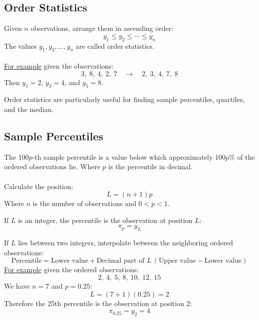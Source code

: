 ﻿\documentclass[12pt]{article}
\begin{document}
\subsection*{Order Statistics}
Given \(n\) observations, arrange them in ascending order:
\[
\boxed{y_1\leq y_2\leq\cdots\leq y_n}
\]
The values \(y_1,y_2,\ldots,y_n\) are called order statistics.\\\\
\underline{For example} given the observations:
\[
3,\ 8,\ 4,\ 2,\ 7\quad\longrightarrow\quad 2,\ 3,\ 4,\ 7,\ 8
\]
Then \(y_1=2\), \(y_3=4\), and \(y_5=8\).

Order statistics are particularly useful for finding sample percentiles, quartiles, and the median.
\subsection*{Sample Percentiles}
The \(100p\)-th sample percentile is a value below which approximately \(100p\%\) of the ordered observations lie. Where $p$ is the percentile in decimal.\\\\
Calculate the position:
\[
\boxed{L=(n+1)p}
\]
Where \(n\) is the number of observations and \(0<p<1\).

If \(L\) is an integer, the percentile is the observation at position \(L\):
\[
\boxed{\pi_p=y_L}
\]

If \(L\) lies between two integers, interpolate between the neighboring ordered observations:
\[
\boxed{\text{Percentile}=\text{Lower value}+\text{Decimal part of }L\,(\text{Upper value}-\text{Lower value})}
\]
\underline{For example} given the ordered observations:
\[
2,\ 4,\ 5,\ 8,\ 10,\ 12,\ 15
\]
We have \(n=7\) and \(p=0.25\):
\[
L=(7+1)(0.25)=2
\]
Therefore the 25th percentile is the observation at position 2:
\[
\pi_{0.25}=y_2=4
\]
\end{document}
